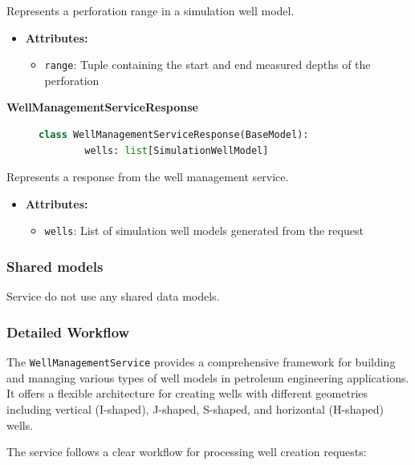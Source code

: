 Represents a perforation range in a simulation well model.

\begin{itemize}
	\item \textbf{Attributes:}
	\begin{itemize}
		\item \texttt{range}: Tuple containing the start and end measured depths of the perforation
	\end{itemize}
\end{itemize}

\textbf{WellManagementServiceResponse}
\begin{figure}[H]
	\begin{lstlisting}[language=Python, caption=WellManagementServiceResponse class definition]
		class WellManagementServiceResponse(BaseModel):
		wells: list[SimulationWellModel]
	\end{lstlisting}
\end{figure}

Represents a response from the well management service.

\begin{itemize}
	\item \textbf{Attributes:}
	\begin{itemize}
		\item \texttt{wells}: List of simulation well models generated from the request
	\end{itemize}
\end{itemize}

\subsubsection{Shared models}

Service do not use any shared data models.

\subsubsection{Detailed Workflow}

The \texttt{WellManagementService} provides a comprehensive framework for building and managing various types of well models in petroleum engineering applications. It offers a flexible architecture for creating wells with different geometries including vertical (I-shaped), J-shaped, S-shaped, and horizontal (H-shaped) wells.

The service follows a clear workflow for processing well creation requests:

